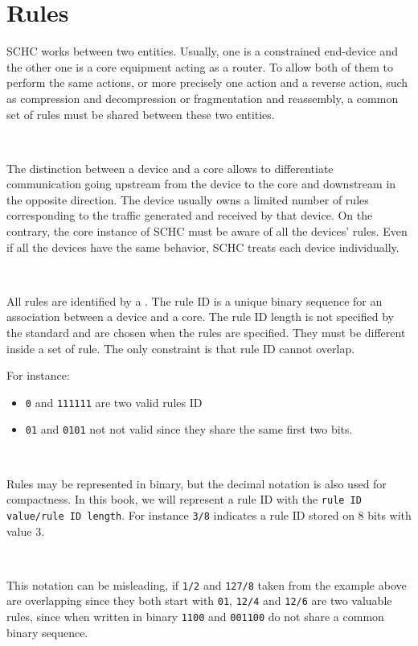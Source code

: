 
\chapter{Rules}

SCHC  works between two entities. Usually, one is a constrained end-device and the other one is a core equipment acting as a router. To allow both of them to perform the same actions, or more precisely one action and a reverse action, such as compression and decompression or fragmentation and reassembly, a common set of rules must be shared between these two entities.

~

The distinction between a device and a core allows to differentiate communication going upstream from the device to the core and downstream in the opposite direction. The device usually owns a limited number of rules corresponding to the traffic  generated and received by that device. On the contrary, the core instance of SCHC must be aware of all the devices' rules. Even if all the devices have the same behavior, SCHC treats each device individually. 

~~

All rules are identified by a . The rule ID is a unique binary sequence for an association between a device and a core. The rule ID length is not specified by the standard and are chosen when the rules are specified. They must be different inside a set of rule. The only constraint is that rule ID cannot overlap.

For instance:

\begin{itemize}
\item\texttt{0} and \texttt{111111} are two valid rules ID
\item \texttt{01} and \texttt{0101} not not valid since they share the same first two bits.
\end{itemize}

~


Rules may be represented in binary, but the decimal notation is also used for compactness. In this book, we will represent a rule ID with the \texttt{rule ID value/rule ID length}. For instance \texttt{3/8} indicates a rule ID stored on 8 bits with value 3.

~

This notation can be misleading, if \texttt{1/2} and \texttt{127/8} taken from the example above are overlapping since they both start with \texttt{01}, \texttt{12/4} and \texttt{12/6} are two valuable rules, since when written in binary \texttt{1100} and \texttt{001100} do not share a common binary sequence.

